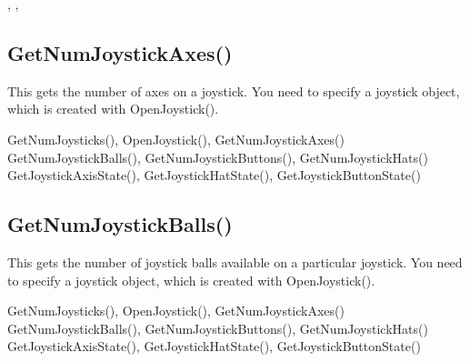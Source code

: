 \documentclass[letterpaper,10pt,english]{sphinxmanual}
\begin{document}
\sphinxAtStartPar
{}

\sphinxAtStartPar
{} ,   , 

\ignorespaces 

\subsection{GetNumJoystickAxes()}
\label{\detokenize{reference/peblenvironment:getnumjoystickaxes}}\label{\detokenize{reference/peblenvironment:index-18}}
\sphinxAtStartPar
{}

\sphinxAtStartPar
{}

\sphinxAtStartPar
This gets the number of axes on a joystick.  You need to specify a joystick object, which is created with OpenJoystick().

\sphinxAtStartPar
{}

\sphinxAtStartPar
GetNumJoysticks(), OpenJoystick(), GetNumJoystickAxes() GetNumJoystickBalls(), GetNumJoystickButtons(), GetNumJoystickHats() GetJoystickAxisState(), GetJoystickHatState(), GetJoystickButtonState()

\ignorespaces 

\subsection{GetNumJoystickBalls()}
\label{\detokenize{reference/peblenvironment:getnumjoystickballs}}\label{\detokenize{reference/peblenvironment:index-19}}
\sphinxAtStartPar
{}

\sphinxAtStartPar
{}

\sphinxAtStartPar
This gets the number of joystick balls available on a particular joystick.  You need to specify a joystick object, which is created with OpenJoystick().

\sphinxAtStartPar
{}

\sphinxAtStartPar
GetNumJoysticks(), OpenJoystick(), GetNumJoystickAxes() GetNumJoystickBalls(), GetNumJoystickButtons(), GetNumJoystickHats() GetJoystickAxisState(), GetJoystickHatState(), GetJoystickButtonState()
\end{document}
